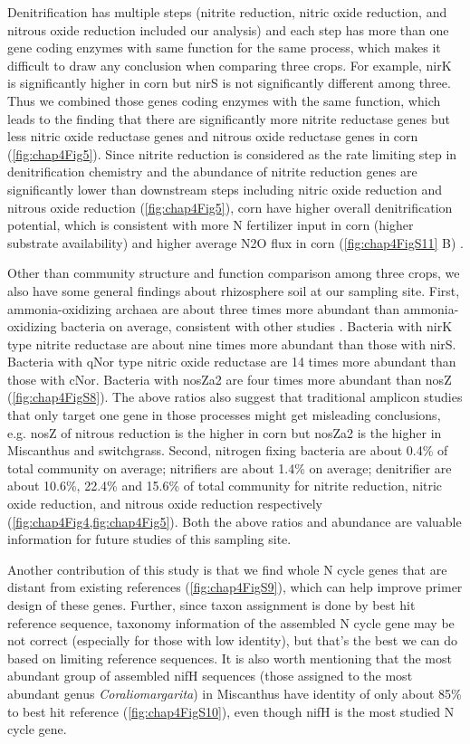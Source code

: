 \documentclass[]{msu-thesis}
\begin{document}
Denitrification has multiple steps (nitrite reduction, nitric oxide reduction, and nitrous oxide reduction included our analysis) and each step has more than one gene coding enzymes with same function for the same process, which makes it difficult to draw any conclusion when comparing three crops. For example, nirK is significantly higher in corn but nirS is not significantly different among three. Thus we combined those genes coding enzymes with the same function, which leads to the finding that there are significantly more nitrite reductase genes but less nitric oxide reductase genes and nitrous oxide reductase genes in corn (\cref{fig:chap4Fig5}). Since nitrite reduction is considered as the rate limiting step in denitrification chemistry \cite{zumft_cell_1997} and the abundance of nitrite reduction genes are significantly lower than downstream steps including nitric oxide reduction and nitrous oxide reduction (\cref{fig:chap4Fig5}), corn have higher overall denitrification potential, which is consistent with more N fertilizer input in corn (higher substrate availability) and higher average N2O flux in corn (\cref{fig:chap4FigS11} B) \cite{oates_nitrous_2015}.

Other than community structure and function comparison among three crops, we also have some general findings about rhizosphere soil at our sampling site. First, ammonia-oxidizing archaea are about three times more abundant than ammonia-oxidizing bacteria on average, consistent with other studies \cite{leininger_archaea_2006,prosser_archaeal_2012,gubry-rangin_archaea_2010}. Bacteria with nirK type nitrite reductase are about nine times more abundant than those with nirS. Bacteria with qNor type nitric oxide reductase are 14 times more abundant than those with cNor. Bacteria with nosZa2 are four times more abundant than nosZ (\cref{fig:chap4FigS8}). The above ratios also suggest that traditional amplicon studies that only target one gene in those processes might get misleading conclusions, e.g. nosZ of nitrous reduction is the higher in corn but nosZa2 is the higher in Miscanthus and switchgrass. Second, nitrogen fixing bacteria are about 0.4\% of total community on average; nitrifiers are about 1.4\% on average; denitrifier are about 10.6\%, 22.4\% and 15.6\% of total community for nitrite reduction, nitric oxide reduction, and nitrous oxide reduction respectively (\cref{fig:chap4Fig4,fig:chap4Fig5}). Both the above ratios and abundance are valuable information for future studies of this sampling site.

Another contribution of this study is that we find whole N cycle genes that are distant from existing references (\cref{fig:chap4FigS9}), which can help improve primer design of these genes. Further, since taxon assignment is done by best hit reference sequence, taxonomy information of the assembled N cycle gene may be not correct (especially for those with low identity), but that’s the best we can do based on limiting reference sequences. It is also worth mentioning that the most abundant group of assembled nifH sequences (those assigned to the most abundant genus \textit{Coraliomargarita}) in Miscanthus have identity of only about 85\% to best hit reference (\cref{fig:chap4FigS10}), even though nifH is the most studied N cycle gene.
\end{document}
